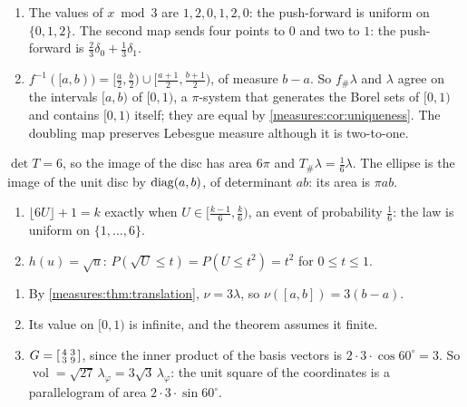 \begin{enumerate}[nosep]
  \item The values of $x\bmod3$ are $1, 2, 0, 1, 2, 0$: the
        push-forward is uniform on $\{0, 1, 2\}$. The second map sends
        four points to $0$ and two to $1$: the push-forward is
        $\frac23\delta_0 + \frac13\delta_1$.
  \item $f^{-1}([a, b)) = [\frac a2, \frac b2)
        \cup[\frac{a + 1}2, \frac{b + 1}2)$, of measure $b - a$. So
        $f_\#\lambda$ and $\lambda$ agree on the intervals $[a, b)$ of
        $[0, 1)$, a $\pi$-system that generates the Borel sets of
        $[0, 1)$ and contains $[0, 1)$ itself; they are equal by
        \cref{measures:cor:uniqueness}. The doubling map preserves
        Lebesgue measure although it is two-to-one.
\end{enumerate}

$\det T = 6$, so the image of the disc has area $6\pi$ and
$T_\#\lambda = \frac16\lambda$. The ellipse is the image of the unit
disc by $\operatorname{diag}(a, b)$, of determinant $ab$: its area is $\pi ab$.

\begin{enumerate}[nosep]
  \item $\lfloor6U\rfloor + 1 = k$ exactly when
        $U\in[\frac{k - 1}6, \frac k6)$, an event of probability
        $\frac16$: the law is uniform on $\{1,\dots,6\}$.
  \item $h(u) = \sqrt u$: $P(\sqrt U\leq t) = P(U\leq t^2) = t^2$ for
        $0\leq t\leq1$.
\end{enumerate}

\begin{enumerate}[nosep]
  \item By \cref{measures:thm:translation}, $\nu = 3\lambda$, so
        $\nu([a, b]) = 3(b - a)$.
  \item Its value on $[0, 1)$ is infinite, and the theorem assumes it
        finite.
  \item $G = \begin{bsmallmatrix}4 & 3\\ 3 & 9\end{bsmallmatrix}$, since
        the inner product of the basis vectors is
        $2\cdot3\cdot\cos60^\circ = 3$. So
        $\operatorname{vol} = \sqrt{27}\,\lambda_\varphi
        = 3\sqrt3\,\lambda_\varphi$: the unit square of the coordinates
        is a parallelogram of area $2\cdot3\cdot\sin60^\circ$.
\end{enumerate}

